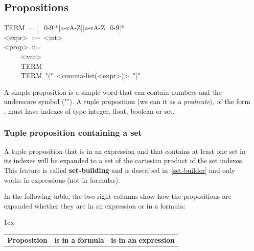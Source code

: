 {\subsection{Propositions}\label{sec-propositions}%
\begin{mdpre}%
\noindent TERM~=~{}[\_0-9]*{}[a-zA-Z]{}[a-zA-Z\_0-9]*\\
{\textless{}expr\textgreater{}}~::=~{\textless{}int\textgreater{}}\\
{\textless{}prop\textgreater{}}~::=\\
~~~~\textbar{}~{\textless{}var\textgreater{}}\\
~~~~\textbar{}~TERM\\
~~~~\textbar{}~TERM~"("~{\textless{}comma-list(\textless{}expr\textgreater{})\textgreater{}}~")"%
\end{mdpre}\noindent A simple proposition is a simple word that can contain numbers and the
underscore symbol ("\mdcode{\_}"). A tuple proposition (we can it as a
\emph{predicate}), of the form , must have indexes of type
integer, float, boolean or set.

\subsubsection{Tuple proposition containing a set}\label{tuple-prop-set}%

\noindent A tuple proposition that is in an expression and that contains at least
one set in its indexes will be expanded to a set of the cartesian product
of the set indexes. This feature is called \textbf{set-building} and is
described in~\ref{set-builder} and only works in expressions (not in
formulas).%

In the following table, the two right-columns show how the propositions
are expanded whether they are in an expression or in a formula:%

\begin{mdcenter}%
\begin{mdtabular}{3}{}{1ex}%
\begin{tabular}{lll}\midrule
\multicolumn{1}{c}{{\bfseries Proposition}}&\multicolumn{1}{c}{{\bfseries is in a formula}}&\multicolumn{1}{c}{{\bfseries is in an expression}}\\


\end{tabular}
\end{mdtabular}
\end{mdcenter}}
